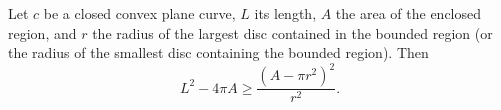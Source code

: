 Let $c$ be a closed convex plane curve, $L$ its length, $A$ the area of the enclosed region, and $r$ the radius of the largest disc contained in the bounded region (or the radius of the smallest disc containing the bounded region). Then
$$L^2 - 4\pi A \geq \frac{(A - \pi r^2)^2}{r^2}.$$
